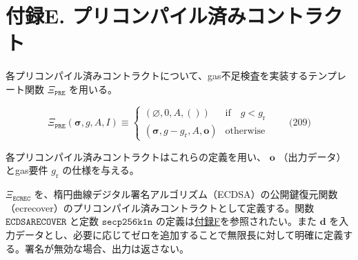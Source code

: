 \documentclass[
]{ltjsarticle}
\begin{document}
\hypertarget{ux4ed8ux9332e.-ux30d7ux30eaux30b3ux30f3ux30d1ux30a4ux30ebux6e08ux307fux30b3ux30f3ux30c8ux30e9ux30afux30c8}{%
\section{付録E.
プリコンパイル済みコントラクト}\label{ux4ed8ux9332e.-ux30d7ux30eaux30b3ux30f3ux30d1ux30a4ux30ebux6e08ux307fux30b3ux30f3ux30c8ux30e9ux30afux30c8}}

各プリコンパイル済みコントラクトについて、gas不足検査を実装するテンプレート関数
\(\Xi_{\mathtt{PRE}}\) を用いる。

\protect\hypertarget{eq-209}{}{}\protect\hypertarget{eq:pre}{}{}

\[\Xi_{\mathtt{PRE}}(\boldsymbol{\sigma}, g, A, I) \equiv \begin{cases}
(\varnothing, 0, A, ()) & \text{if} \quad g < g_{\mathrm{r}} \\
(\boldsymbol\sigma, g - g_{\mathrm{r}}, A, \mathbf{o}) & \text{otherwise}\end{cases} \qquad \text{(209)}\]

各プリコンパイル済みコントラクトはこれらの定義を用い、 \(\mathbf{o}\)
（出力データ）とgas要件 \(g_{\mathrm{r}}\) の仕様を与える。

\(\Xi_{\mathtt{ECREC}}\)
を、楕円曲線デジタル署名アルゴリズム（ECDSA）の公開鍵復元関数（ecrecover）のプリコンパイル済みコントラクトとして定義する。関数
\(\mathtt{ECDSARECOVER}\) と定数 \(\mathtt{secp256k1n}\)
の定義は\protect\hyperlink{app:signing}{付録F}を参照されたい。また
\(\mathbf{d}\)
を入力データとし、必要に応じてゼロを追加することで無限長に対して明確に定義する。署名が無効な場合、出力は返さない。

\protect\hypertarget{eq-210}{}{}\protect\hypertarget{eq-211}{}{}\protect\hypertarget{eq-212}{}{}\protect\hypertarget{eq-213}{}{}\protect\hypertarget{eq-214}{}{}\protect\hypertarget{eq-215}{}{}\protect\hypertarget{eq-216}{}{}\protect\hypertarget{eq-217}{}{}\protect\hypertarget{eq-218}{}{}\protect\hypertarget{eq-219}{}{}\protect\hypertarget{eq-220}{}{}\protect\hypertarget{eq-221}{}{}\protect\hypertarget{eq:ecrec_precompile_validity}{}{}
\end{document}
